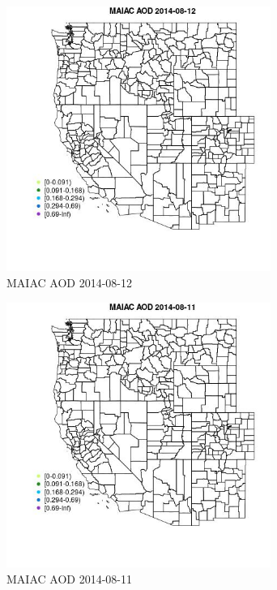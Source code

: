 \begin{figure} 
\centering  
\includegraphics[width=0.77\textwidth]{Code_Outputs/Report_ML_input_PM25_Step4_part_e_de_duplicated_aveswNAs_MapObsMAIAC_AOD2014-08-12.jpg} 
\caption{\label{fig:Report_ML_input_PM25_Step4_part_e_de_duplicated_aveswNAsMapObsMAIAC_AOD2014-08-12}MAIAC AOD 2014-08-12} 
\end{figure} 
 

\begin{figure} 
\centering  
\includegraphics[width=0.77\textwidth]{Code_Outputs/Report_ML_input_PM25_Step4_part_e_de_duplicated_aveswNAs_MapObsMAIAC_AOD2014-08-11.jpg} 
\caption{\label{fig:Report_ML_input_PM25_Step4_part_e_de_duplicated_aveswNAsMapObsMAIAC_AOD2014-08-11}MAIAC AOD 2014-08-11} 
\end{figure} 
 

